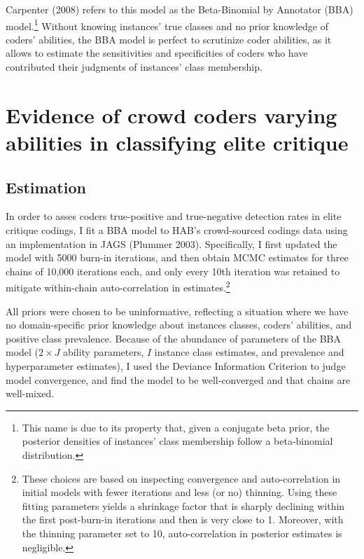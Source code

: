 \documentclass[12pt,]{article}
\begin{document}
Carpenter (2008) refers to this model as the Beta-Binomial by Annotator
(BBA) model.\footnote{This name is due to its property that, given a
  conjugate beta prior, the posterior densities of instances' class
  membership follow a beta-binomial distribution.} Without knowing
instances' true classes and no prior knowledge of coders' abilities, the
BBA model is perfect to scrutinize coder abilities, as it allows to
estimate the sensitivities and specificities of coders who have
contributed their judgments of instances' class membership.

\hypertarget{evidence-of-crowd-coders-varying-abilities-in-classifying-elite-critique}{%
\section{Evidence of crowd coders varying abilities in classifying elite
critique}\label{evidence-of-crowd-coders-varying-abilities-in-classifying-elite-critique}}

\hypertarget{estimation}{%
\subsection{Estimation}\label{estimation}}

In order to asses coders true-positive and true-negative detection rates
in elite critique codings, I fit a BBA model to HAB's crowd-sourced
codings data using an implementation in JAGS (Plummer 2003).
Specifically, I first updated the model with 5000 burn-in iterations,
and then obtain MCMC estimates for three chains of 10,000 iterations
each, and only every 10th iteration was retained to mitigate
within-chain auto-correlation in estimates.\footnote{These choices are
  based on inspecting convergence and auto-correlation in initial models
  with fewer iterations and less (or no) thinning. Using these fitting
  parameters yields a shrinkage factor that is sharply declining within
  the first post-burn-in iterations and then is very close to 1.
  Moreover, with the thinning parameter set to 10, auto-correlation in
  posterior estimates is negligible.}

All priors were chosen to be uninformative, reflecting a situation where
we have no domain-specific prior knowledge about instances classes,
coders' abilities, and positive class prevalence. Because of the
abundance of parameters of the BBA model (\(2 \times J\) ability
parameters, \(I\) instance class estimates, and prevalence and
hyperparameter estimates), I used the Deviance Information Criterion to
judge model convergence, and find the model to be well-converged and
that chains are well-mixed.
\end{document}
